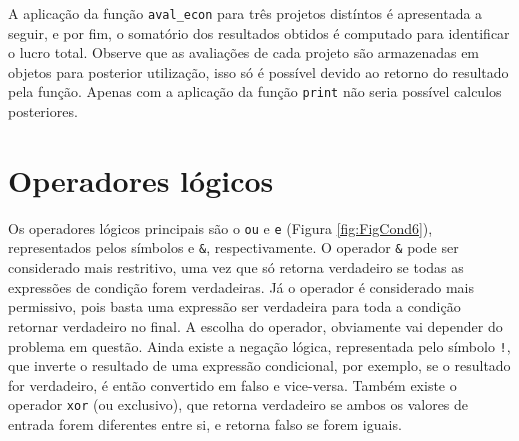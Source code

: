 \documentclass[
  11pt,
  a5paper,
  openany]{book}
\newenvironment{Shaded}{\begin{snugshade}}{\end{snugshade}}
\newcommand{\CommentTok}[1]{\textcolor[rgb]{0.56,0.35,0.01}{\textit{#1}}}
\newcommand{\DecValTok}[1]{\textcolor[rgb]{0.00,0.00,0.81}{#1}}
\newcommand{\KeywordTok}[1]{\textcolor[rgb]{0.13,0.29,0.53}{\textbf{#1}}}
\newcommand{\NormalTok}[1]{#1}
\newcommand{\OperatorTok}[1]{\textcolor[rgb]{0.81,0.36,0.00}{\textbf{#1}}}
\newcommand{\StringTok}[1]{\textcolor[rgb]{0.31,0.60,0.02}{#1}}
\begin{document}
A aplicação da função \texttt{aval\_econ} para três projetos distíntos é apresentada a seguir, e por fim, o somatório dos resultados obtidos é computado para identificar o lucro total. Observe que as avaliações de cada projeto são armazenadas em objetos para posterior utilização, isso só é possível devido ao retorno do resultado pela função. Apenas com a aplicação da função \texttt{print} não seria possível calculos posteriores.

\begin{Shaded}
\end{Shaded}

\hypertarget{operadores-luxf3gicos}{%
\section{Operadores lógicos}\label{operadores-luxf3gicos}}

Os operadores lógicos principais são o \texttt{ou} e \texttt{e} (Figura \ref{fig:FigCond6}), representados pelos símbolos \texttt{\textbar{}} e \texttt{\&}, respectivamente. O operador \texttt{\&} pode ser considerado mais restritivo, uma vez que só retorna verdadeiro se todas as expressões de condição forem verdadeiras. Já o operador \texttt{\textbar{}} é considerado mais permissivo, pois basta uma expressão ser verdadeira para toda a condição retornar verdadeiro no final. A escolha do operador, obviamente vai depender do problema em questão. Ainda existe a negação lógica, representada pelo símbolo \texttt{!}, que inverte o resultado de uma expressão condicional, por exemplo, se o resultado for verdadeiro, é então convertido em falso e vice-versa. Também existe o operador \texttt{xor} (ou exclusivo), que retorna verdadeiro se ambos os valores de entrada forem diferentes entre si, e retorna falso se forem iguais.
\end{document}
